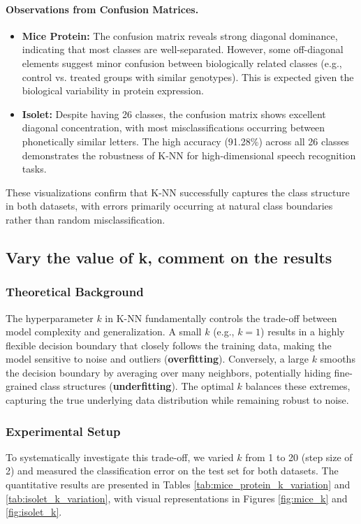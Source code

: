 \documentclass[12pt]{article}
\begin{document}
\paragraph{Observations from Confusion Matrices.}
\begin{itemize}
    \item \textbf{Mice Protein:} The confusion matrix reveals strong diagonal dominance, indicating that most classes are well-separated. However, some off-diagonal elements suggest minor confusion between biologically related classes (e.g., control vs. treated groups with similar genotypes). This is expected given the biological variability in protein expression.
    \item \textbf{Isolet:} Despite having 26 classes, the confusion matrix shows excellent diagonal concentration, with most misclassifications occurring between phonetically similar letters. The high accuracy (91.28\%) across all 26 classes demonstrates the robustness of K-NN for high-dimensional speech recognition tasks.
\end{itemize}

These visualizations confirm that K-NN successfully captures the class structure in both datasets, with errors primarily occurring at natural class boundaries rather than random misclassification.

\subsection{Vary the value of k, comment on the results}

\subsubsection{Theoretical Background}
The hyperparameter $k$ in K-NN fundamentally controls the trade-off between model complexity and generalization. A small $k$ (e.g., $k=1$) results in a highly flexible decision boundary that closely follows the training data, making the model sensitive to noise and outliers (\textbf{overfitting}). Conversely, a large $k$ smooths the decision boundary by averaging over many neighbors, potentially hiding fine-grained class structures (\textbf{underfitting}). The optimal $k$ balances these extremes, capturing the true underlying data distribution while remaining robust to noise.

\subsubsection{Experimental Setup}
To systematically investigate this trade-off, we varied $k$ from 1 to 20 (step size of 2) and measured the classification error on the test set for both datasets. The quantitative results are presented in Tables \ref{tab:mice_protein_k_variation} and \ref{tab:isolet_k_variation}, with visual representations in Figures \ref{fig:mice_k} and \ref{fig:isolet_k}.
\end{document}
